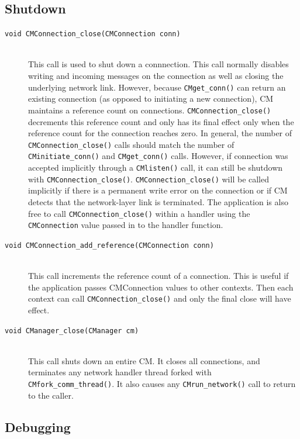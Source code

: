 \documentclass[11pt]{article}
\begin{document}
\subsection{Shutdown}
\begin{description}
\item[{\tt void CMConnection\_close(CMConnection conn)}] \ \\ This call is used to
shut down a connnection.  This call normally disables writing and incoming
messages on the connection as well as closing the underlying network link.
However, because {\tt CMget\_conn()} can return an existing connection (as
opposed to initiating a new connection), CM maintains a reference count on
connections.   {\tt CMConnection\_close()} decrements this reference count
and only has its final effect only when the reference count for the
connection reaches zero.  In general, the number of {\tt
CMConnection\_close()} calls should match the number of {\tt
CMinitiate\_conn()} and {\tt CMget\_conn()} calls.  However, if connection
was accepted implicitly through a {\tt CMlisten()} call, it can still be
shutdown with {\tt CMConnection\_close()}.  {\tt CMConnection\_close()} will
be called implicitly if there is a permanent write error on the connection
or if CM detects that the network-layer link is terminated.  The application
is also free to call {\tt CMConnection\_close()} within a handler using the
{\tt CMConnection} value passed in to the handler function.

\item[{\tt void CMConnection\_add\_reference(CMConnection conn)}]\ \\
This call increments the reference count of a connection.  This is useful if
the application passes CMConnection values to other contexts.  Then each
context can call {\tt CMConnection\_close()} and only the final close
will have effect.
\item[{\tt void CManager\_close(CManager cm)}] \ \\
This call shuts down an entire CM.  It closes all connections, and
terminates any network handler thread forked with {\tt
CMfork\_comm\_thread()}.  It also causes any {\tt CMrun\_network()} call to
return to the caller.
\end{description}
\subsection{Debugging}
\end{document}
